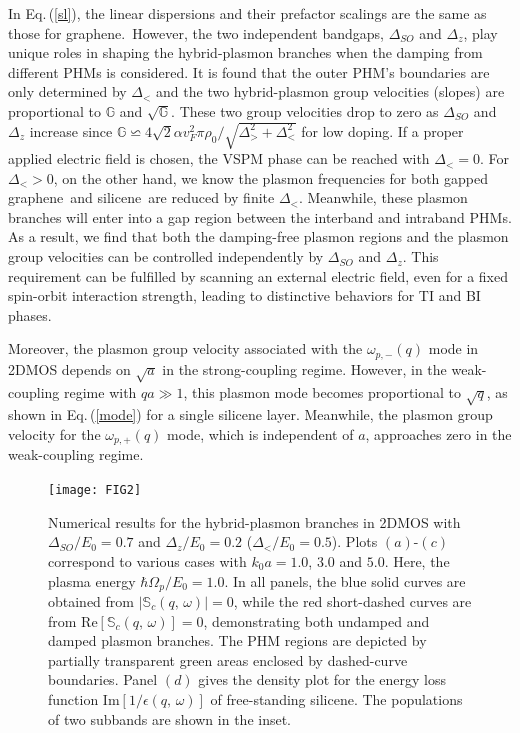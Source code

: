 \documentclass[aps,prb,showpacs]{revtex4}
\newcommand{\mbb}{\mathbb}
\begin{document}
In Eq.\,(\ref{sl}), the linear dispersions and their prefactor scalings are the same as those for graphene.\,\cite{ourPRB15} 
However, the two independent bandgaps, $\Delta_{SO}$ and $\Delta_z$, play unique roles in shaping the hybrid-plasmon branches when the damping from different PHMs is considered. 
It is found that the outer PHM's boundaries are only determined by $\Delta_{<}$ and the two hybrid-plasmon group velocities (slopes) are proportional to $\mbb{G}$ and $\sqrt{\mbb{G}}$.
These two group velocities drop to zero as $\Delta_{SO}$ and $\Delta_z$ increase since $\mbb{G}\backsimeq 4\sqrt{2}\alpha v_F^2\pi\rho_0/\sqrt{\Delta_>^2 + \Delta_<^2}$ for low doping. 
If a proper applied electric field is chosen, the VSPM phase can be reached with $\Delta_{<}=0$. For $\Delta_{<}>0$, on the other hand, 
we know the plasmon frequencies for both gapped graphene\,\cite{pavlo1} and silicene\,\cite{SilMain} are reduced by finite $\Delta_{<}$. Meanwhile,
these plasmon branches will enter into a gap region between the interband and intraband PHMs. As a result, we find that 
both the damping-free plasmon regions and the plasmon group velocities can be controlled independently by $\Delta_{SO}$ and $\Delta_z$. This requirement can be fulfilled by scanning an external electric field, 
even for a fixed spin-orbit interaction strength, leading to distinctive behaviors for TI and BI phases. 
\medskip

Moreover, the plasmon group velocity associated with the $\omega_{p,-}(q)$ mode in 2DMOS depends on $\sqrt{a}$ in the strong-coupling regime. 
However, in the weak-coupling regime with $qa\gg 1$, this plasmon mode becomes proportional to $\sqrt{q}$, as shown in Eq.\,(\ref{mode}) for a single silicene layer. 
Meanwhile, the plasmon group velocity for the $\omega_{p,+}(q)$ mode, which is independent of $a$, approaches zero in the weak-coupling regime.
 
\begin{figure}
\centering
\texttt{[image: FIG2]}
\caption{Numerical results for the hybrid-plasmon branches in 2DMOS with $\Delta_{SO}/E_0=0.7$ and $\Delta_{z}/E_0=0.2$ ($\Delta_</E_0=0.5$).
Plots $(a)$-$(c)$ correspond to various cases with $k_0a=1.0$, $3.0$ and $5.0$. Here, the plasma energy $\hbar\Omega_p/E_0=1.0$.
In all panels, the blue solid curves are obtained from $|\mathbb{S}_c(q,\,\omega)|=0$, while the red short-dashed curves
are from $\text{Re}\left[\mathbb{S}_c(q,\,\omega)\right]=0$, 
demonstrating both undamped and damped plasmon branches. The PHM regions are depicted by partially transparent green areas enclosed by dashed-curve boundaries.  
Panel $(d)$ gives the density plot for the energy loss function $\text{Im}\left[1/\epsilon(q,\,\omega)\right]$ of free-standing silicene. 
The populations of two subbands are shown in the inset.}
\label{FIG:2}
\end{figure}
\end{document}
